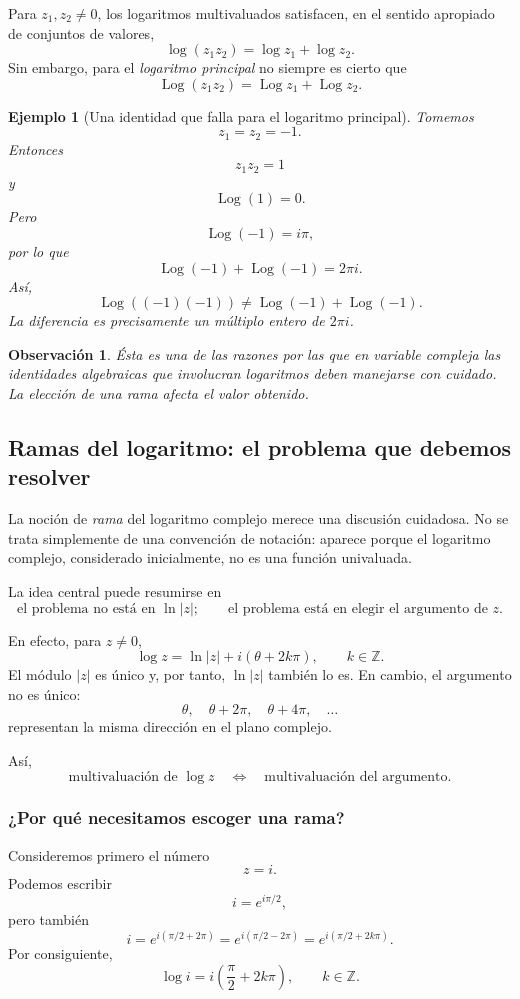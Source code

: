 \documentclass[12pt]{article}
\newtheorem{ejemplo}{Ejemplo}[section]
\newtheorem{Obs}{Observaci\'on}[section]
\begin{document}
Para $z_1,z_2\neq0$, los logaritmos multivaluados satisfacen, en el sentido
apropiado de conjuntos de valores,
\[
\log(z_1z_2)=\log z_1+\log z_2.
\]
Sin embargo, para el \emph{logaritmo principal} no siempre es cierto que
\[
\operatorname{Log}(z_1z_2)
=
\operatorname{Log}z_1+\operatorname{Log}z_2.
\]

\begin{ejemplo}[Una identidad que falla para el logaritmo principal]
Tomemos
\[
z_1=z_2=-1.
\]
Entonces
\[
z_1z_2=1
\]
y
\[
\operatorname{Log}(1)=0.
\]
Pero
\[
\operatorname{Log}(-1)=i\pi,
\]
por lo que
\[
\operatorname{Log}(-1)+\operatorname{Log}(-1)
=2\pi i.
\]
Así,
\[
\boxed{
\operatorname{Log}((-1)(-1))
\neq
\operatorname{Log}(-1)+\operatorname{Log}(-1).
}
\]
La diferencia es precisamente un múltiplo entero de $2\pi i$.
\end{ejemplo}

\begin{Obs}
Ésta es una de las razones por las que en variable compleja las identidades
algebraicas que involucran logaritmos deben manejarse con cuidado. La elección
de una rama afecta el valor obtenido.
\end{Obs}

\subsection*{Ramas del logaritmo: el problema que debemos resolver}
La noción de \emph{rama} del logaritmo complejo merece una discusión cuidadosa.
No se trata simplemente de una convención de notación: aparece porque el
logaritmo complejo, considerado inicialmente, no es una función univaluada.

La idea central puede resumirse en
\[
\boxed{
\text{el problema no está en }\ln|z|;
\qquad
\text{el problema está en elegir el argumento de }z.
}
\]

En efecto, para $z\neq0$,
\[
\log z=\ln|z|+i(\theta+2k\pi),\qquad k\in\mathbb Z.
\]
El módulo $|z|$ es único y, por tanto, $\ln|z|$ también lo es. En cambio,
el argumento no es único:
\[
\theta,\quad\theta+2\pi,\quad\theta+4\pi,\quad\ldots
\]
representan la misma dirección en el plano complejo.

Así,
\[
\boxed{
\text{multivaluación de }\log z
\quad\Longleftrightarrow\quad
\text{multivaluación del argumento}.
}
\]
\subsubsection*{¿Por qué necesitamos escoger una rama?}
Consideremos primero el número
\[
z=i.
\]
Podemos escribir
\[
i=e^{i\pi/2},
\]
pero también
\[
i=e^{i(\pi/2+2\pi)}
=e^{i(\pi/2-2\pi)}
=e^{i(\pi/2+2k\pi)}.
\]
Por consiguiente,
\[
\log i
=
i\left(\frac{\pi}{2}+2k\pi\right),
\qquad k\in\mathbb Z.
\]
\end{document}
